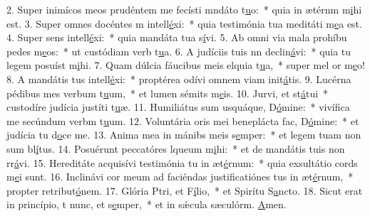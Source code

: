 2. Super inimícos meos prudéntem me fecísti mndáto t\uline{u}o:~* quia in ætérnm m\uline{i}hi est.
3. Super omnes docéntes m intell\uline{é}xi:~* quia testimónia tua meditáti m\uline{e}a est.
4. Super sens intell\uline{é}xi:~* quia mandáta tua s\uline{í}vi.
5. Ab omni via mala prohíbu pedes m\uline{e}os:~* ut custódiam verb t\uline{u}a.
6. A judíciis tuis nn declin\uline{á}vi:~* quia tu legem posuíst m\uline{i}hi.
7. Quam dúlcia fáucibus meis elquia t\uline{u}a,~* super mel or m\uline{e}o!
8. A mandátis tus intell\uline{é}xi:~* proptérea odívi omnem viam init\uline{á}tis.
9. Lucérna pédibus mes verbum t\uline{u}um,~* et lumen sémits m\uline{e}is.
10. Jurvi, et st\uline{á}tui~* custodíre judícia justíti t\uline{u}æ.
11. Humiliátus sum usquáque, D\uline{ó}mine:~* vivífica me secúndum verbm t\uline{u}um.
12. Voluntária oris mei beneplácta fac, D\uline{ó}mine:~* et judícia tu d\uline{o}ce me.
13. Anima mea in mánibs meis s\uline{e}mper:~* et legem tuam non sum bl\uline{í}tus.
14. Posuérunt peccatóres lqueum m\uline{i}hi:~* et de mandátis tuis non rr\uline{á}vi.
15. Hereditáte acquisívi testimónia tu in æt\uline{é}rnum:~* quia exsultátio cords m\uline{e}i sunt.
16. Inclinávi cor meum ad faciéndas justificatiónes tus in æt\uline{é}rnum,~* propter retribut\uline{ó}nem.
17. Glória Ptri, et F\uline{í}lio,~* et Spirítu S\uline{a}ncto.
18. Sicut erat in princípio, t nunc, et s\uline{e}mper,~* et in sǽcula sæculórm. \uline{A}men.
